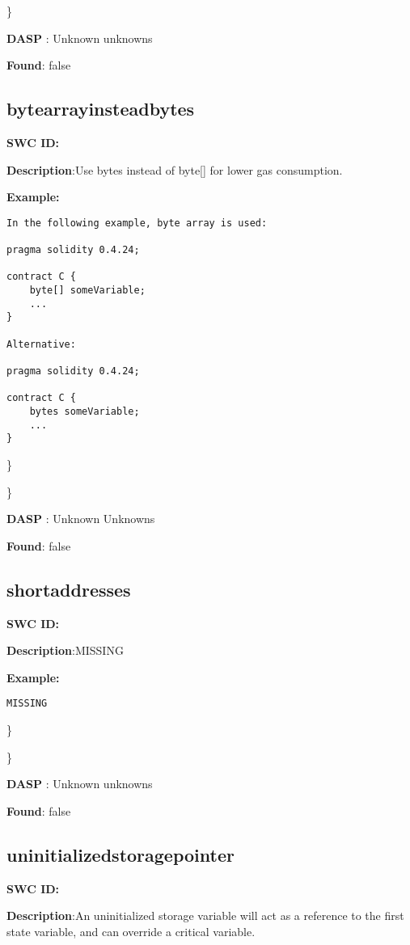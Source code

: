 \documentclass{article}
\begin{document}
\} 

\textbf{DASP} : Unknown unknowns

\textbf{Found}: false

\subsection{byte\textunderscore array\textunderscore instead\textunderscore bytes} 
\textbf{SWC \textunderscore ID:} 

\textbf{Description}:Use bytes instead of byte[] for lower gas consumption.


\textbf{Example:} 
\begin{verbatim}
In the following example, byte array is used:

pragma solidity 0.4.24;

contract C {
    byte[] someVariable;
    ...
}

Alternative:

pragma solidity 0.4.24;

contract C {
    bytes someVariable;
    ...
}

\end{verbatim}\} 

\} 

\textbf{DASP} : Unknown Unknowns

\textbf{Found}: false

\subsection{short\textunderscore addresses} 
\textbf{SWC \textunderscore ID:} 

\textbf{Description}:MISSING


\textbf{Example:} 
\begin{verbatim}
MISSING

\end{verbatim}\} 

\} 

\textbf{DASP} : Unknown unknowns

\textbf{Found}: false

\subsection{uninitialized\textunderscore storage\textunderscore pointer} 
\textbf{SWC \textunderscore ID:} 

\textbf{Description}:An uninitialized storage variable will act as a reference to the first state variable, and can override a critical variable.
\end{document}
